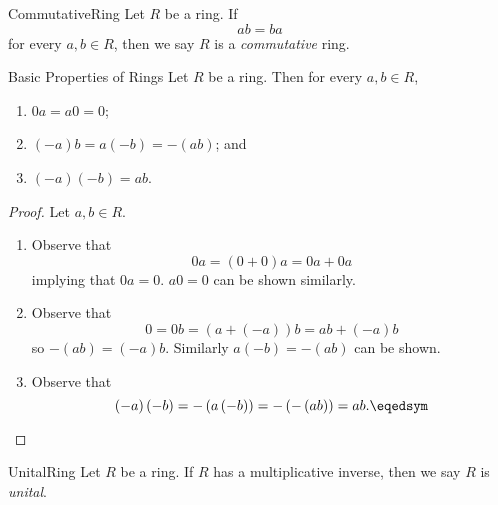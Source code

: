 \documentclass[pmath347]{subfiles}
\begin{document}
    \begin{definition}{Commutative}{Ring}
        Let $R$ be a ring. If
        \begin{equation*}
            ab=ba
        \end{equation*}
        for every $a,b\in R$, then we say $R$ is a \emph{commutative} ring.
    \end{definition}

    \begin{prop}{Basic Properties of Rings}
        Let $R$ be a ring. Then for every $a,b\in R$,
        \begin{enumerate}
            \item $0a = a 0 = 0$;
            \item $\left( -a \right) b = a\left( -b \right) = -\left( ab \right)$; and
            \item $\left( -a \right) \left( -b \right) = ab$.
        \end{enumerate}
    \end{prop}
    
    \begin{proof}
        Let $a,b\in R$.
        \begin{enumerate}
            \item Observe that
                \begin{equation*}
                    0a = \left( 0+0 \right) a = 0a+0a
                \end{equation*}
                implying that $0a = 0$. $a0 =0$ can be shown similarly. \qqqedsym
            \item Observe that
                \begin{equation*}
                    0 = 0b = \left( a+\left( -a \right)  \right) b = ab + \left( -a \right) b
                \end{equation*}
                so $-\left( ab \right) = \left( -a \right) b$. Similarly $a\left( -b \right) = -\left( ab \right)$ can be shown. \qqqedsym
            \item Observe  that
                \begin{equation*}
                    \left( -a \right) \left( -b \right) = -\left( a\left( -b \right)  \right) = -\left( -\left( ab \right)  \right) = ab. \eqedsym
                \end{equation*}
        \end{enumerate}
    \end{proof}

    \begin{definition}{Unital}{Ring}
        Let $R$ be a ring. If $R$ has a multiplicative inverse, then we say $R$ is \emph{unital}.
    \end{definition}
\end{document}
